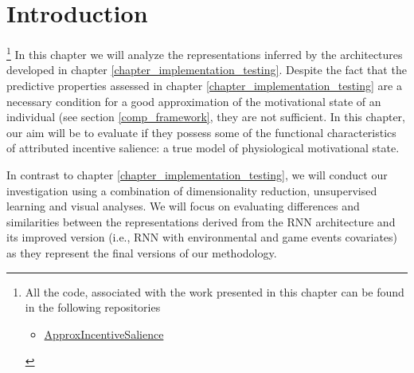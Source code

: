 \section{Introduction}
\label{representation_analysis_introduction}
 \footnote{All the code, associated with the work presented in this chapter can be found in the following repositories \begin{itemize}
     \item \href{https://github.com/vb690/approx_incentive_salience}{ApproxIncentiveSalience}
 \end{itemize}}
In this chapter we will analyze the representations inferred by the architectures developed in chapter \ref{chapter_implementation_testing}. Despite the fact that the predictive properties assessed in chapter \ref{chapter_implementation_testing} are a necessary condition for a good approximation of the motivational state of an individual (see section \ref{comp_framework}, they are not sufficient. In this chapter, our aim will be to evaluate if they possess some of the functional characteristics of attributed incentive salience: a true model of physiological motivational state.

In contrast to chapter \ref{chapter_implementation_testing}, we will conduct our investigation using a combination of dimensionality reduction, unsupervised learning and visual analyses. We will focus on evaluating differences and similarities between the representations derived from the RNN architecture and its improved version (i.e., RNN with environmental and game events covariates) as they represent the final versions of our methodology.

